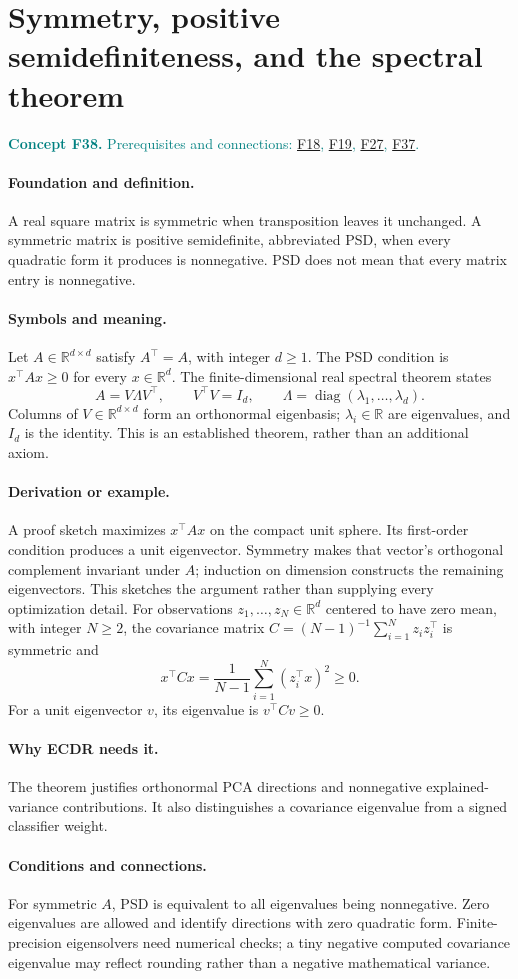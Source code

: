 \documentclass[11pt,a4paper]{article}
\newcommand{\R}{\mathbb R}
\newcommand{\diag}{\operatorname{diag}}
\newcommand{\conceptid}{Front matter}
\newcommand{\concept}[3]{\clearpage\renewcommand{\conceptid}{#1}%
\section{#2}\label{concept:#1}%
\textcolor{teal}{\textbf{Concept #1.} Prerequisites and connections: #3.}\par
\typeout{ECDR-CONCEPT-START #1 PAGE=\thepage}}
\begin{document}
\concept{F38}{Symmetry, positive semidefiniteness, and the spectral theorem}{\hyperref[concept:F18]{F18}, \hyperref[concept:F19]{F19}, \hyperref[concept:F27]{F27}, \hyperref[concept:F37]{F37}}
\paragraph{Foundation and definition.}
A real square matrix is symmetric when transposition leaves it
unchanged. A symmetric matrix is positive semidefinite, abbreviated PSD,
when every quadratic form it produces is nonnegative. PSD does not mean
that every matrix entry is nonnegative.
\paragraph{Symbols and meaning.}
Let $A\in\R^{d\times d}$ satisfy $A^\top=A$, with integer
$d\ge1$. The PSD condition is $x^\top Ax\ge0$ for every
$x\in\R^d$. The finite-dimensional real spectral theorem states
\[
 A=V\Lambda V^\top,\qquad V^\top V=I_d,
 \qquad\Lambda=\diag(\lambda_1,\ldots,\lambda_d).
\]
Columns of $V\in\R^{d\times d}$ form an orthonormal eigenbasis;
$\lambda_i\in\R$ are eigenvalues, and $I_d$ is the identity.
This is an established theorem, rather than an additional axiom.
\paragraph{Derivation or example.}
A proof sketch maximizes $x^\top Ax$ on the compact unit sphere.
Its first-order condition produces a unit eigenvector. Symmetry makes
that vector's orthogonal complement invariant under $A$; induction on
dimension constructs the remaining eigenvectors. This sketches the
argument rather than supplying every optimization detail.
For observations $z_1,\ldots,z_N\in\R^d$ centered to have zero
mean, with integer $N\ge2$, the covariance matrix
$C=(N-1)^{-1}\sum_{i=1}^{N}z_i z_i^\top$ is symmetric and
\[
 x^\top Cx=\frac1{N-1}\sum_{i=1}^{N}(z_i^\top x)^2\ge0.
\]
For a unit eigenvector $v$, its eigenvalue is $v^\top Cv\ge0$.
\paragraph{Why ECDR needs it.}
The theorem justifies orthonormal PCA directions and nonnegative
explained-variance contributions. It also distinguishes a covariance
eigenvalue from a signed classifier weight.
\paragraph{Conditions and connections.}
For symmetric $A$, PSD is equivalent to all eigenvalues being
nonnegative. Zero eigenvalues are allowed and identify directions with
zero quadratic form. Finite-precision eigensolvers need numerical
checks; a tiny negative computed covariance eigenvalue may reflect
rounding rather than a negative mathematical variance.
\par\label{endconcept:F38}
\end{document}
